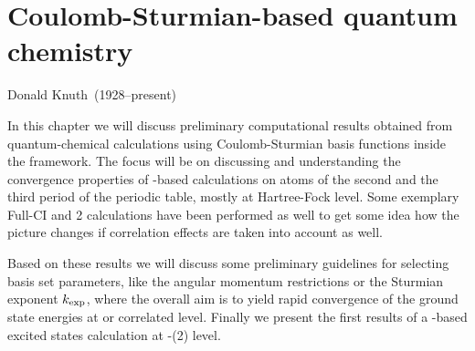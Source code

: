 \chapter{Coulomb-Sturmian-based quantum chemistry}
\label{ch:CSQChem}
{Donald Knuth~(1928--present)}

\noindent
In this chapter we will discuss preliminary computational results
obtained from quantum-chemical calculations using Coulomb-Sturmian
basis functions inside the \linebreak \molsturm framework.
The focus will be on discussing and understanding the convergence
properties of \CS-based calculations on atoms of
the second and the third period of the periodic table,
mostly at Hartree-Fock level.
Some exemplary Full-CI and {\MP}2 calculations have been performed
as well to get some idea how the picture changes
if correlation effects are taken into account as well.

Based on these results we will discuss some
preliminary guidelines for selecting \CS basis set parameters,
like the angular momentum restrictions or the Sturmian exponent $k_\text{exp}$,
where the overall aim is to yield rapid convergence
of the ground state energies at \HF or correlated level.
Finally we present the first results of a \CS-based
excited states calculation at \ADC-(2) level.





% 
% 

